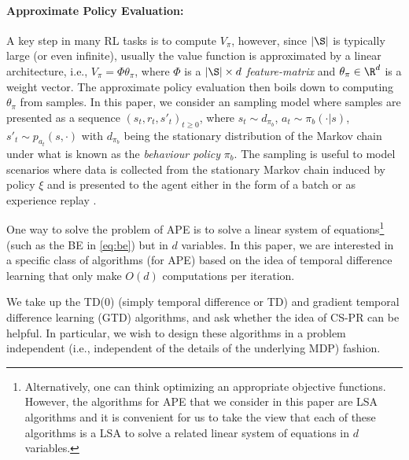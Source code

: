 \paragraph{Approximate Policy Evaluation:} A key step in many RL tasks is to compute $V_\pi$, however,  since $|\S|$ is typically large (or even infinite), usually the value function is approximated by a linear architecture, i.e., $V_\pi=\Phi \theta_\pi$, where $\Phi$ is a $|\S|\times d$ \emph{feature-matrix} and  $\theta_\pi \in \R^d$ is a weight vector. The approximate policy evaluation then boils down to computing $\theta_\pi$ from samples. In this paper, we consider an \iid sampling model where samples are presented as a sequence $(s_t,r_t,s'_t)_{t\geq0}$, where $s_t\sim d_{\pi_b}$, $a_t\sim \pi_b(\cdot|s)$, $s'_t\sim p_{a_t}(s,\cdot)$ with $d_{\pi_b}$ being the stationary distribution of the Markov chain under what is known as the \emph{behaviour policy} $\pi_b$. The sampling is useful to model scenarios where data is collected from the stationary Markov chain induced by policy $\xi$ and is presented to the agent either in the form of a batch \cite{lange} or as experience replay \cite{lin}. 

One way to solve the problem of APE is to solve a linear system of equations\footnote{Alternatively, one can think optimizing an appropriate objective functions. However, the algorithms for APE that we consider in this paper are LSA algorithms and it is convenient for us to take the view that each of these algorithms is a LSA to solve a related linear system of equations in $d$ variables.} (such as the BE in \eqref{eq:be}) but in $d$ variables. In this paper, we are interested in a specific class of algorithms (for APE) based on the idea of temporal difference learning that only make $O(d)$ computations per iteration.
 
 We take up the TD(0) (simply temporal difference or TD) \cite{sutton} and gradient temporal difference learning (GTD) \cite{gtd} algorithms, and ask whether the idea of CS-PR can be helpful. In particular, we wish to design these algorithms in a problem independent (i.e., independent of the details of the underlying MDP) fashion.
